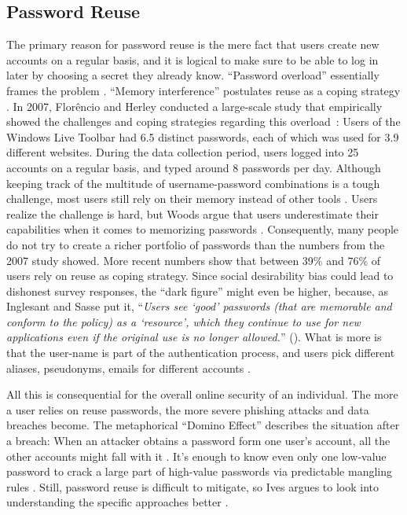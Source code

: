 	\subsection{Password Reuse}
	The primary reason for password reuse is the mere fact that users create new accounts on a regular basis, and it is logical to make sure to be able to log in later by choosing a secret they already know. ``Password overload'' essentially frames the problem \cite{Yang2016MnemonicSentenceBased}. ``Memory interference'' postulates reuse as a coping strategy \cite{Chiasson2009InterferencesGraphical}. In 2007, Florêncio and Herley conducted a large-scale study that empirically showed the challenges and coping strategies regarding this overload \cite{Florencio2007LargeScaleStudyPasswordHabits}: Users of the Windows Live Toolbar had 6.5 distinct passwords, each of which was used for 3.9 different websites. During the data collection period, users logged into 25 accounts on a regular basis, and typed around 8 passwords per day. Although keeping track of the multitude of username-password combinations is a tough challenge, most users still rely on their memory instead of other tools \cite{Olmstead2017AmerciansCybersecurity}. Users realize the challenge is hard, but Woods \etal argue that users underestimate their capabilities when it comes to memorizing passwords \cite{Woods2018TooManyPasswords}. Consequently, many people do not try to create a richer portfolio of passwords than the numbers from the 2007 study showed. More recent numbers show that between 39\% \cite{Olmstead2017AmerciansCybersecurity} and 76\% \cite{CSID2012PasswordHabits} of users rely on reuse as coping strategy. Since social desirability bias could lead to dishonest survey responses, the ``dark figure'' might even be higher, because, as Inglesant and Sasse put it, ``\textit{Users see `good' passwords (that are memorable and conform to the policy) as a `resource', which they continue to use for new applications even if the original use is no longer allowed.}'' (\cite{Inglesant2010TrueCostOfUnusablePolicies}). What is more is that the user-name is part of the authentication process, and users pick different aliases, pseudonyms, emails for different accounts \cite{Hayashi2011DiaryStudyPWs}.
	
	All this is consequential for the overall online security of an individual. The more a user relies on reuse passwords, the more severe phishing attacks and data breaches become. The metaphorical ``Domino Effect'' describes the situation after a breach: When an attacker obtains a password form one user's account, all the other accounts might fall with it \cite{Ives2004DominoEffectReuse}. It's enough to know even only one low-value password to crack a large part of high-value passwords via predictable mangling rules \cite{Das2014TangledWeb, Haque2014Hierarchy}. Still, password reuse is difficult to mitigate, so Ives argues to look into understanding the specific approaches better \cite{Ives2004DominoEffectReuse}.
	
